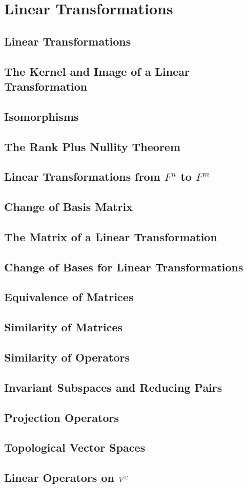 \chapter{Linear Transformations}
\section{Linear Transformations}
\section{The Kernel and Image of a Linear Transformation}
\section{Isomorphisms}
\section{The Rank Plus Nullity Theorem}
\section{Linear Transformations from $F^n$ to $F^m$}
\section{Change of Basis Matrix}
\section{The Matrix of a Linear Transformation}
\section{Change of Bases for Linear Transformations}
\section{Equivalence of Matrices}
\section{Similarity of Matrices}
\section{Similarity of Operators}
\section{Invariant Subspaces and Reducing Pairs}
\section{Projection Operators}
\section{Topological Vector Spaces}
\section{Linear Operators on $V^{\mathbb{C}}$}

